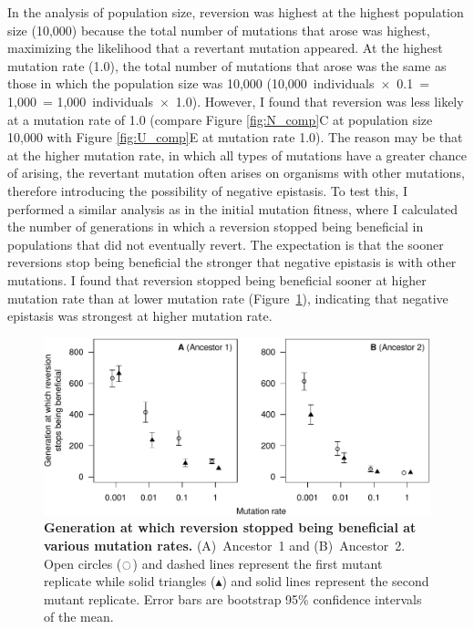 \begin{doublespace}
In the analysis of population size, reversion was highest
at the highest population size (10,000) because
the total number of mutations that arose was highest,
maximizing the likelihood that a revertant mutation appeared.
%
At the highest mutation rate (1.0),
the total number of mutations that arose was the same
as those in which the population size was 10,000
(10,000~individuals~$\times$~0.1~= 1,000~= 1,000~individuals~$\times$~1.0).
%
However, I found that reversion was less likely at a mutation rate of 1.0
(compare Figure \ref{fig:N_comp}C at population size 10,000
with Figure \ref{fig:U_comp}E at mutation rate 1.0).
%
The reason may be that at the higher mutation rate,
in which all types of mutations have a greater chance of arising,
the revertant mutation often arises on organisms with other mutations,
therefore introducing the possibility of negative epistasis.
%
To test this, I performed a similar analysis as in the initial mutation
fitness, where I calculated the number of generations in which a reversion
stopped being beneficial in populations that did not eventually revert.
%
The expectation is that the sooner reversions stop being beneficial
the stronger that negative epistasis is with other mutations.
%
I found that reversion stopped being beneficial sooner
at higher mutation rate than at lower mutation rate
(Figure~\ref{fig:first-update-rev-bad-U}),
indicating that negative epistasis was strongest at higher mutation rate.



\begin{figure}[b!]
\begin{center}
\includegraphics[width=\linewidth]{first-update-rev-bad-U.pdf}
\end{center}
\caption{
  {\bf Generation at which reversion stopped being beneficial
  at various mutation rates.}
  (A)~Ancestor~1 and (B)~Ancestor~2.
  Open circles ($\ocircle$) and dashed lines
  represent the first mutant replicate
  while solid triangles ($\blacktriangle$) and solid lines
  represent the second mutant replicate.
  Error bars are bootstrap 95\% confidence intervals of the mean.}
\label{fig:first-update-rev-bad-U}
\end{figure}




\end{doublespace}
